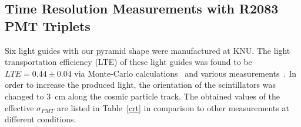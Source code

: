 \subsection{Time Resolution Measurements with R2083 PMT Triplets}

Six light guides with our pyramid shape were manufactured at KNU.  The light 
transportation efficiency (LTE) of these light guides was found to be 
$LTE=0.44\pm0.04$ via Monte-Carlo calculations~\cite{mutch} and various 
measurements~\cite{llg}.  In order to increase the produced light, the 
orientation of the scintillators was changed to 3~cm along the cosmic particle 
track.  The obtained values of the effective $\sigma_{PMT}$ are listed in 
Table~\ref{crt} in comparison to other measurements at different conditions. 

